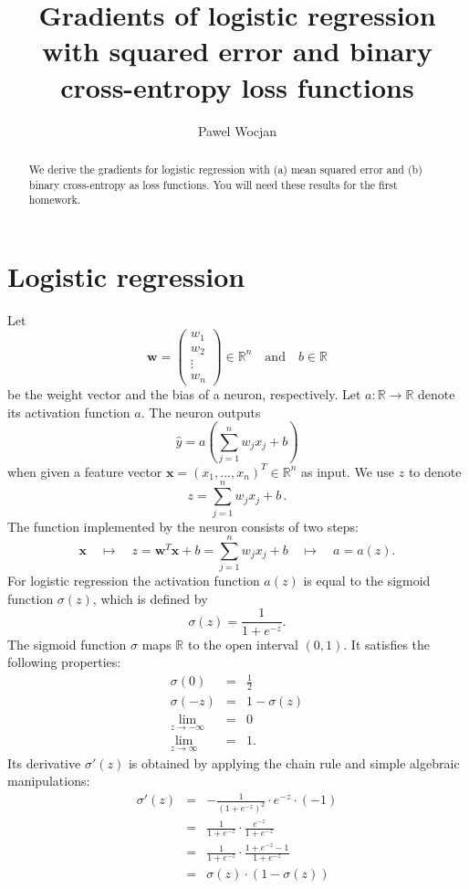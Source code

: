 \documentclass[12pt]{article}
\title{Gradients of logistic regression with squared error and binary cross-entropy loss functions}
\author{Pawel Wocjan}
\newcommand{\R}{\mathbb{R}}
\newcommand{\x}{\boldsymbol{x}}
\newcommand{\w}{\boldsymbol{w}}
\begin{document}
\maketitle


\begin{abstract}
We derive the gradients for logistic regression with (a) mean squared error and (b) binary cross-entropy as loss functions. You will need these results for the first homework.
\end{abstract}

\section{Logistic regression}

Let 
\begin{equation}
\w=
\left(
\begin{array}{c}
w_1 \\
w_2 \\
\vdots \\
w_n
\end{array}
\right)\in\R^n
\quad
\mbox{and}
\quad
b \in \R
\end{equation}
be the weight vector and the bias of a neuron, respectively.  Let $a : \R \rightarrow \R$ denote its activation function $a$. The neuron outputs
\begin{equation}
\hat{y} = a\left( \sum_{j=1}^n w_j x_j + b \right)
\end{equation}
when given a feature vector $\x=(x_1,\ldots,x_n)^T\in\R^n$ as input.
We use $z$ to denote
\begin{equation}
z = \sum_{j=1}^n w_j x_j + b\,.
\end{equation}
The function implemented by the neuron consists of two steps:
\begin{equation}
\x \quad \mapsto \quad z = \w^T \x + b = \sum_{j=1}^n w_j x_j + b \quad \mapsto \quad a = a(z).
\end{equation}
For logistic regression the activation function $a(z)$ is equal to the sigmoid function $\sigma(z)$, which is defined by 
\begin{equation}
\sigma(z) = \frac{1}{1+e^{-z}}.
\end{equation}
The sigmoid function $\sigma$ maps $\R$ to the open interval $(0,1)$. It satisfies the following properties:
\begin{eqnarray}
\sigma(0) & = & \frac{1}{2} \\
\sigma(-z) & = & 1 - \sigma(z) \\
\lim_{z\rightarrow -\infty} & = & 0 \\
\lim_{z\rightarrow \infty} & = & 1.
\end{eqnarray}
Its derivative $\sigma'(z)$ is obtained by applying the chain rule and simple algebraic manipulations:
\begin{eqnarray}
\sigma'(z) 
& = & 
-\frac{1}{(1+e^{-z})^2} \cdot e^{-z} \cdot (-1) \\
& = &
\frac{1}{1+e^{-z}} \cdot \frac{e^{-z}}{1+e^{-z}} \\
& = &
\frac{1}{1+e^{-z}} \cdot \frac{1 + e^{-z} - 1}{1+e^{-z}} \\
& = &
\sigma(z) \cdot (1-\sigma(z)) 
\end{eqnarray}
\end{document}
